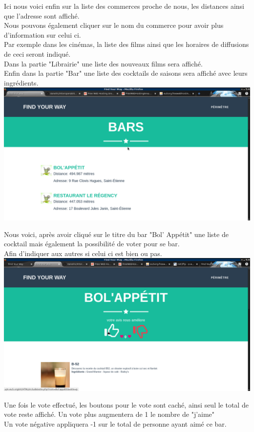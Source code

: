 \documentclass[10pt,a4paper, landscape]{report}
\begin{document}
Ici nous voici enfin sur la liste des commerces proche de nous, les distances ainsi que l'adresse sont affiché. \\
Nous pouvons également cliquer sur le nom du commerce pour avoir plus d'information sur celui ci. \\
Par exemple dans les cinémas, la liste des films ainsi que les horaires de diffusions de ceci seront indiqué. \\
Dans la partie "Librairie" une liste des nouveaux films sera affiché. \\
Enfin dans la partie "Bar" une liste des cocktails de saisons sera affiché avec leurs ingrédients. \\
\includegraphics[scale=0.5]{images/bar_liste.png} 

\newpage
Nous voici, après avoir cliqué sur le titre du bar "Bol' Appétit" une liste de cocktail mais également la possibilité de voter pour se bar. \\
Afin d'indiquer aux autres si celui ci est bien ou pas. \\
\includegraphics[scale=0.5]{images/cocktail.png} 

\newpage
Une fois le vote effectué, les boutons pour le vote sont caché, ainsi seul le total de vote reste affiché.
Un vote plus augmentera de 1 le nombre de "j'aime" \\
Un vote négative appliquera -1 sur le total de personne ayant aimé ce bar. \\
\end{document}
